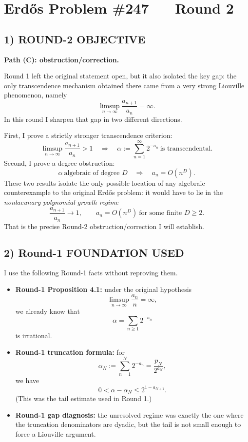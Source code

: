 \section*{Erd\H{o}s Problem \#247 --- Round 2}

\subsection*{1) ROUND-2 OBJECTIVE}
\textbf{Path (C): obstruction/correction.}

Round 1 left the original statement open, but it also isolated the key gap: the only transcendence mechanism obtained there came from a very strong Liouville phenomenon, namely
\[
\limsup_{n\to\infty}\frac{a_{n+1}}{a_n}=\infty.
\]
In this round I sharpen that gap in two different directions.

First, I prove a strictly stronger transcendence criterion:
\[
\limsup_{n\to\infty}\frac{a_{n+1}}{a_n}>1
\quad\Longrightarrow\quad
\alpha:=\sum_{n=1}^\infty 2^{-a_n}\ \text{is transcendental}.
\]
Second, I prove a degree obstruction:
\[
\alpha\ \text{algebraic of degree }D
\quad\Longrightarrow\quad
 a_n=O(n^D).
\]
These two results isolate the only possible location of any algebraic counterexample to the original Erd\H{o}s problem: it would have to lie in the \emph{nonlacunary polynomial-growth regime}
\[
\frac{a_{n+1}}{a_n}\to 1,
\qquad
 a_n=O(n^D)\ \text{for some finite }D\ge 2.
\]
That is the precise Round-2 obstruction/correction I will establish.

\subsection*{2) Round-1 FOUNDATION USED}
I use the following Round-1 facts without reproving them.

\begin{itemize}
\item \textbf{Round-1 Proposition 4.1:} under the original hypothesis
\[
\limsup_{n\to\infty}\frac{a_n}{n}=\infty,
\]
we already know that
\[
\alpha=\sum_{n\ge 1}2^{-a_n}
\]
is irrational.

\item \textbf{Round-1 truncation formula:} for
\[
\alpha_N:=\sum_{n=1}^N2^{-a_n}=\frac{p_N}{2^{a_N}},
\]
we have
\[
0<\alpha-\alpha_N\le 2^{1-a_{N+1}}.
\]
(This was the tail estimate used in Round 1.)

\item \textbf{Round-1 gap diagnosis:} the unresolved regime was exactly the one where the truncation denominators are dyadic, but the tail is not small enough to force a Liouville argument.
\end{itemize}

